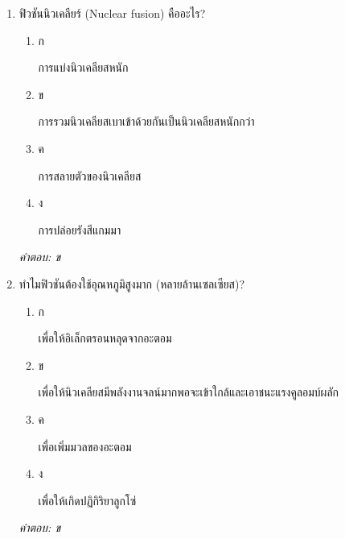 \documentclass[12pt]{article}
\begin{document}
\begin{enumerate}[label=\arabic*., itemsep=0.5\baselineskip, topsep=0.5\baselineskip, leftmargin=*]
\item ฟิวชันนิวเคลียร์ (Nuclear fusion) คืออะไร?
\begin{enumerate}[label=\alph*)., itemsep=0.3\baselineskip, topsep=0.3\baselineskip]
\item ก\ 
\begin{minipage}[t]{0.9\linewidth}
\raggedright การแบ่งนิวเคลียสหนัก
\end{minipage}
\item ข\ 
\begin{minipage}[t]{0.9\linewidth}
\raggedright การรวมนิวเคลียสเบาเข้าด้วยกันเป็นนิวเคลียสหนักกว่า
\end{minipage}
\item ค\ 
\begin{minipage}[t]{0.9\linewidth}
\raggedright การสลายตัวของนิวเคลียส
\end{minipage}
\item ง\ 
\begin{minipage}[t]{0.9\linewidth}
\raggedright การปล่อยรังสีแกมมา
\end{minipage}
\end{enumerate}
\vspace{-0.3\baselineskip}
\begin{small}
\textit{คำตอบ: ข}
\end{small}

\item ทำไมฟิวชันต้องใช้อุณหภูมิสูงมาก (หลายล้านเซลเซียส)?
\begin{enumerate}[label=\alph*)., itemsep=0.3\baselineskip, topsep=0.3\baselineskip]
\item ก\ 
\begin{minipage}[t]{0.9\linewidth}
\raggedright เพื่อให้อิเล็กตรอนหลุดจากอะตอม
\end{minipage}
\item ข\ 
\begin{minipage}[t]{0.9\linewidth}
\raggedright เพื่อให้นิวเคลียสมีพลังงานจลน์มากพอจะเข้าใกล้และเอาชนะแรงคูลอมบ์ผลัก
\end{minipage}
\item ค\ 
\begin{minipage}[t]{0.9\linewidth}
\raggedright เพื่อเพิ่มมวลของอะตอม
\end{minipage}
\item ง\ 
\begin{minipage}[t]{0.9\linewidth}
\raggedright เพื่อให้เกิดปฏิกิริยาลูกโซ่
\end{minipage}
\end{enumerate}
\vspace{-0.3\baselineskip}
\begin{small}
\textit{คำตอบ: ข}
\end{small}


\end{enumerate}
\end{document}

